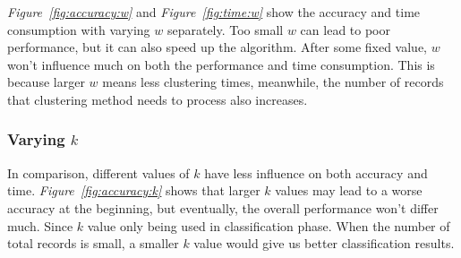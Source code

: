 \documentclass[runningheads]{llncs}
\begin{document}
	\textit{Figure~\ref{fig:accuracy:w}} and \textit{Figure~\ref{fig:time:w}} show the accuracy and time consumption with varying $w$ separately. Too small $w$ can lead to poor performance, but it can also speed up the algorithm. After some fixed value, $w$ won't influence much on both the performance and time consumption. This is because larger $w$ means less clustering times, meanwhile, the number of records that clustering method needs to process also increases. 
	
	\subsubsection{Varying $k$}
	
	In comparison, different values of $k$ have less influence on both accuracy and time. \textit{Figure~\ref{fig:accuracy:k}} shows that larger $k$ values may lead to a worse accuracy at the beginning, but eventually, the overall performance won't differ much. Since $k$ value only being used in classification phase. When the number of total records is small, a smaller $k$ value would give us  better classification results.
	
\end{document}
